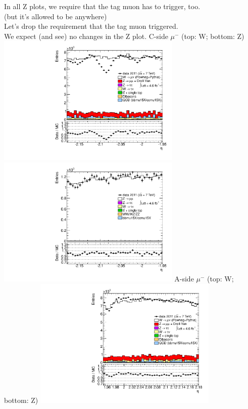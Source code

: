  {
In all Z plots, we require that the tag muon has to trigger, too. \\
(but it's allowed to be anywhere) \\
Let's drop the requirement that the tag muon triggered. \\
We expect (and see) no changes in the Z plot.
}
 {
\colb[T]
C-side $\mu^{-}$ (top: W; bottom: Z)
\centering
\includegraphics[width=0.66\textwidth]{dates/20130306/figures/both/W_10_C_stack_l_eta_NEG} \\
\includegraphics[width=0.66\textwidth]{dates/20130306/figures/both/Ztprobe_10_C_stack_lN_eta_ALL.pdf}
A-side $\mu^{-}$ (top: W; bottom: Z)
\centering
\includegraphics[width=0.66\textwidth]{dates/20130306/figures/both/W_10_A_stack_l_eta_NEG} \\
}
